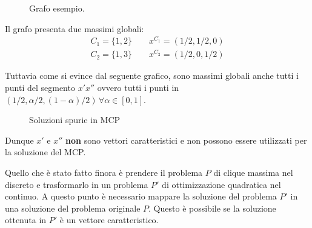 \begin{figure}[h!]
    \centering
    \caption{Grafo esempio.}
\end{figure}
 Il grafo presenta due massimi globali:
 \begin{align*}
     C_1 = \{1,2\} \qquad  x^{C_1} = (1 / 2, 1 / 2, 0) \\
     C_2 = \{1,3 \} \qquad x^{C_2} = (1 / 2, 0, 1 / 2)
 \end{align*}

Tuttavia come si evince dal seguente grafico, sono massimi globali anche tutti i punti del segmento $x'x''$ ovvero tutti i punti in $(1/2, \alpha / 2, (1 - \alpha) / 2) \, \forall \alpha \in [0,1]$.
\begin{figure}[h!]
    \centering
    \caption{Soluzioni spurie in MCP}
\end{figure}

Dunque $x'$ e $x''$ \textbf{non} sono vettori caratteristici e non possono essere utilizzati per la soluzione del MCP.

\newpage

Quello che è stato fatto finora è prendere il problema $P$ di clique massima nel discreto e trasformarlo in un problema $P'$ di ottimizzazione quadratica nel continuo. A questo punto è necessario mappare la soluzione del problema $P'$ in una soluzione del problema originale $P$.  Questo è possibile se la soluzione ottenuta in $P'$ è un vettore caratteristico.\\

